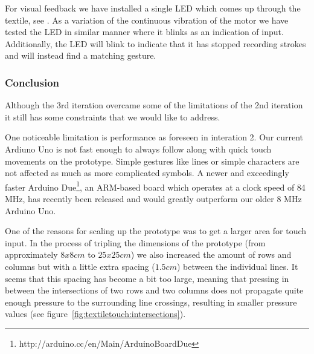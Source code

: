 For visual feedback we have installed a single LED which comes up through the textile, see .
As a variation of the continuous vibration of the motor we have tested the LED in similar manner where it blinks as an indication of input.
Additionally, the LED will blink to indicate that it has stopped recording strokes and will instead find a matching gesture.


\subsubsection{Conclusion} 

Although the 3rd iteration overcame some of the limitations of the 2nd iteration it still has some constraints that we would like to address.

One noticeable limitation is performance as foreseen in interation 2.
Our current Ardiuno Uno is not fast enough to always follow along with quick touch movements on the prototype.
Simple gestures like lines or simple characters are not affected as much as more complicated symbols.
A newer and exceedingly faster Arduino Due\footnote{http://arduino.cc/en/Main/ArduinoBoardDue}, an ARM-based board which operates at a clock speed of 84 MHz, has recently been released and would greatly outperform our older 8 MHz Arduino Uno.

One of the reasons for scaling up the prototype was to get a larger area for touch input.
In the process of tripling the dimensions of the prototype (from approximately \(8x8cm\) to \(25x25cm\)) we also increased the amount of rows and columns but with a little extra spacing (\(1.5cm\)) between the individual lines.
It seems that this spacing has become a bit too large, meaning that pressing in between the intersections of two rows and two columns does not propagate quite enough pressure to the surrounding line crossings, resulting in smaller pressure values (see figure~\ref{fig:textiletouch:intersections}).

